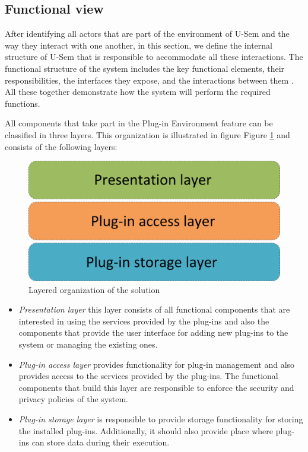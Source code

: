 \subsection{Functional view}

After identifying all actors that are part of the environment of U-Sem and the way they interact with one another, in this section, we define the internal structure of U-Sem that is responsible to accommodate all these interactions. The functional structure of the system includes the key functional elements, their responsibilities, the interfaces they expose, and the interactions between them \cite{rozanski2011software}. All these together demonstrate how the system will perform the required functions.

All components that take part in the Plug-in Environment feature can be classified in three layers. This organization is illustrated in figure Figure \ref{fig_layer} and consists of the following layers:

\begin{figure}[h!]
  \centering
  	\includegraphics[scale=0.6]{plug-in/layers/layers.png}
  \caption{Layered organization of the solution}
  \label{fig_layer}
\end{figure}

\begin{itemize}
	\item \textit{Presentation layer} this layer consists of all functional components that are interested in using the services provided by the plug-ins and also the components that provide the user interface for adding new plug-ins to the system or managing the existing ones. 
	\item \textit{Plug-in access layer} provides functionality for plug-in management and also provides access to the services provided by the plug-ins. The functional components that build this layer are responsible to enforce the security and privacy policies of the system.
	\item \textit{Plug-in storage layer} is responsible to provide storage functionality for storing the installed plug-ins. Additionally, it should also provide place where plug-ins can store data during their execution.
	\end{itemize}

